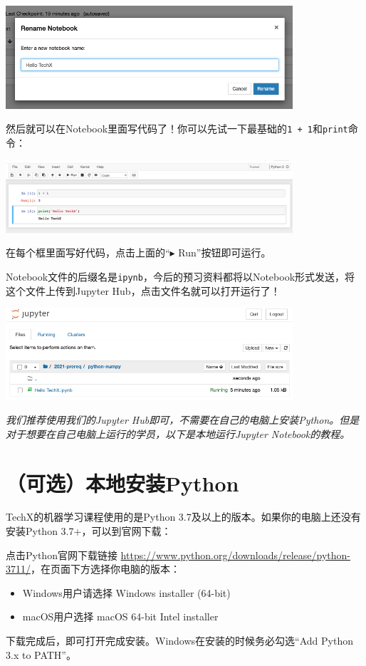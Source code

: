 \documentclass{article}
\begin{document}
\vspace*{0.3cm}\centerline{\noindent\includegraphics[width=0.8\textwidth]{ipynb-rename.png}}

然后就可以在Notebook里面写代码了！你可以先试一下最基础的\texttt{1 + 1}和\texttt{print}命令：

\vspace*{0.3cm}\centerline{\noindent\includegraphics[width=0.8\textwidth]{ipynb-code.png}}

在每个框里面写好代码，点击上面的“$\blacktriangleright$ Run”按钮即可运行。

Notebook文件的后缀名是\texttt{ipynb}，今后的预习资料都将以Notebook形式发送，将这个文件上传到Jupyter Hub，点击文件名就可以打开运行了！

\vspace*{0.3cm}\centerline{\noindent\includegraphics[width=0.8\textwidth]{ipynb-open.png}}

\emph{我们推荐使用我们的Jupyter Hub即可，不需要在自己的电脑上安装Python。但是对于想要在自己电脑上运行的学员，以下是本地运行Jupyter Notebook的教程。}

\section{（可选）本地安装Python}
TechX的机器学习课程使用的是Python 3.7及以上的版本。如果你的电脑上还没有安装Python 3.7+，可以到官网下载：

点击Python官网下载链接 \url{https://www.python.org/downloads/release/python-3711/}，在页面下方选择你电脑的版本：
\begin{itemize}
\item
Windows用户请选择 Windows installer (64-bit)
\item
macOS用户选择 macOS 64-bit Intel installer
\end{itemize}
下载完成后，即可打开完成安装。Windows在安装的时候务必勾选“Add Python 3.x to PATH”。
\end{document}
